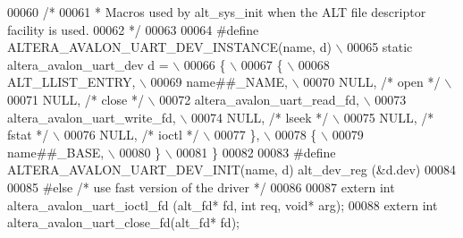 \begin{DoxyCode}
00060 \textcolor{comment}{/*}
00061 \textcolor{comment}{ * Macros used by alt\_sys\_init when the ALT file descriptor facility is used.}
00062 \textcolor{comment}{ */}
00063 
00064 \textcolor{preprocessor}{#define ALTERA\_AVALON\_UART\_DEV\_INSTANCE(name, d)    \(\backslash\)}
00065 \textcolor{preprocessor}{  static altera\_avalon\_uart\_dev d =                 \(\backslash\)}
00066 \textcolor{preprocessor}{    \{                                               \(\backslash\)}
00067 \textcolor{preprocessor}{      \{                                             \(\backslash\)}
00068 \textcolor{preprocessor}{        ALT\_LLIST\_ENTRY,                            \(\backslash\)}
00069 \textcolor{preprocessor}{        name##\_NAME,                                \(\backslash\)}
00070 \textcolor{preprocessor}{        NULL, }\textcolor{comment}{/* open */}\textcolor{preprocessor}{                            \(\backslash\)}
00071 \textcolor{preprocessor}{        NULL, }\textcolor{comment}{/* close */}\textcolor{preprocessor}{                           \(\backslash\)}
00072 \textcolor{preprocessor}{        altera\_avalon\_uart\_read\_fd,                 \(\backslash\)}
00073 \textcolor{preprocessor}{        altera\_avalon\_uart\_write\_fd,                \(\backslash\)}
00074 \textcolor{preprocessor}{        NULL, }\textcolor{comment}{/* lseek */}\textcolor{preprocessor}{                           \(\backslash\)}
00075 \textcolor{preprocessor}{        NULL, }\textcolor{comment}{/* fstat */}\textcolor{preprocessor}{                           \(\backslash\)}
00076 \textcolor{preprocessor}{        NULL, }\textcolor{comment}{/* ioctl */}\textcolor{preprocessor}{                           \(\backslash\)}
00077 \textcolor{preprocessor}{      \},                                            \(\backslash\)}
00078 \textcolor{preprocessor}{      \{                                             \(\backslash\)}
00079 \textcolor{preprocessor}{        name##\_BASE,                                \(\backslash\)}
00080 \textcolor{preprocessor}{      \}                                             \(\backslash\)}
00081 \textcolor{preprocessor}{    \}}
00082 
00083 \textcolor{preprocessor}{#define ALTERA\_AVALON\_UART\_DEV\_INIT(name, d) alt\_dev\_reg (&d.dev)}
00084 
00085 \textcolor{preprocessor}{#else }\textcolor{comment}{/* use fast version of the driver */}\textcolor{preprocessor}{}
00086 
00087 \textcolor{keyword}{extern} \textcolor{keywordtype}{int} altera_avalon_uart_ioctl_fd (alt_fd* fd, \textcolor{keywordtype}{int} req, \textcolor{keywordtype}{void}* arg);
00088 \textcolor{keyword}{extern} \textcolor{keywordtype}{int} altera_avalon_uart_close_fd(alt_fd* fd);

\end{DoxyCode}
